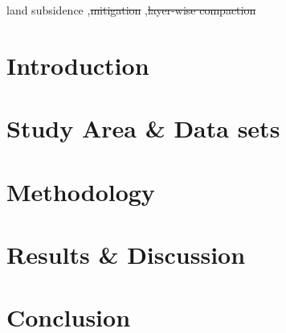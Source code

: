 \documentclass[a4paper,fleqn]{cas-dc}
\begin{document}
	\begin{keywords}
		land subsidence \sep \st{mitigation} \sep \st{layer-wise compaction}
	\end{keywords}
	
	\maketitle
	
	\linenumbers
	
	\section{Introduction}
	\label{sec:intro}
	
	\section{Study Area \& Data sets}
	\label{sec:studyarea}
	
	
%	
	
	\section{Methodology}
	\label{sec:method}
	
	
	\section{Results \& Discussion}
	\label{sec:result}
	
	
	\section{Conclusion}
	\label{sec:conclusion}
	
\end{document}
